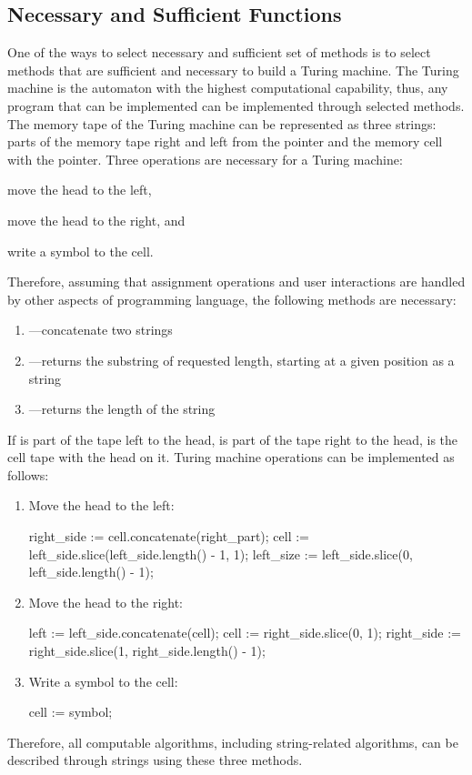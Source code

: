 \documentclass[11pt,nonacm,natbib=false]{acmart}
\begin{document}
\subsection{Necessary and Sufficient Functions}
One of the ways to select necessary and sufficient set of methods is to select methods that are sufficient and necessary to build a Turing machine. The Turing machine is the automaton with the highest computational capability, thus, any program that can be implemented can be implemented through selected methods. The memory tape of the Turing machine can be represented as three strings: parts of the memory tape right and left from the pointer and the memory cell with the pointer. Three operations are necessary for a Turing machine: \begin{inparaenum}
 \item move the head to the left, 
 \item move the head to the right, and 
 \item write a symbol to the cell.
 \end{inparaenum}
 Therefore, assuming that assignment operations and user interactions are handled by other aspects of programming language, the following methods are necessary:
\begin{enumerate}
    \item {}---concatenate two strings
    \item {}---returns the substring of requested length, starting at a given position as a string
    \item {}---returns the length of the string
\end{enumerate}
If  is part of the tape left to the head,  is part of the tape right to the head,  is the cell tape with the head on it.
Turing machine operations can be implemented as follows: 
\begin{enumerate}
\item Move the head to the left: 
\begin{ffcode}
right_side := cell.concatenate(right_part);
cell := left_side.slice(left_side.length() - 1, 1);
left_size := left_side.slice(0, left_side.length() - 1);
\end{ffcode}
\item Move the head to the right: 
\begin{ffcode}
left := left_side.concatenate(cell);
cell := right_side.slice(0, 1);
right_side := right_side.slice(1, right_side.length() - 1);
\end{ffcode}
\item Write a symbol to the cell: 
\begin{ffcode}
cell := symbol;
\end{ffcode}
\end{enumerate}
Therefore, all computable algorithms, including string-related algorithms, can be described through strings using these three methods.
\end{document}
